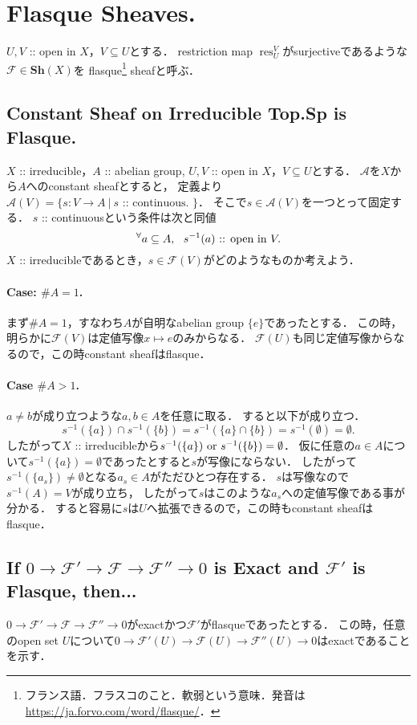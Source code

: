 \documentclass[a4paper]{jsarticle}
\newcommand{\shA}{\mathcal{A}}
\newcommand{\shF}{\mathcal{F}}
\newcommand{\Sh}{\mathbf{Sh}}
\newcommand{\res}{\operatorname{res}}
\newcommand{\OpenIn}{\text{ :: open in }}
\begin{document}
\section{Flasque Sheaves.} %
    $U,V$ :: open in $X$，$V \subseteq U$とする．
    restriction map $\res_U^V$がsurjectiveであるような$\shF \in \Sh(X)$を
    flasque\footnote{フランス語．フラスコのこと．軟弱という意味．発音は \url{https://ja.forvo.com/word/flasque/}．} sheafと呼ぶ．

    \subsection{Constant Sheaf on Irreducible Top.Sp is Flasque.}
    $X$ :: irreducible，$A$ :: abelian group, $U,V$ :: open in $X$，$V \subseteq U$とする．
    $\shA$を$X$から$A$へのconstant sheafとすると，
    定義より$\shA(V)=\{ s: V \to A ~|~ s \text{ :: continuous. }\}$．
    そこで$s \in \shA(V)$を一つとって固定する．
    $s$ :: continuousという条件は次と同値
    \[ \Forall{a \subseteq A} s^{-1}(a) \OpenIn V. \]
    $X$ :: irreducibleであるとき，$s \in \shF(V)$がどのようなものか考えよう．
    
    \paragraph{Case: $\#A=1$.}
    まず$\#A=1$，すなわち$A$が自明なabelian group $\{e\}$であったとする．
    この時，明らかに$\shF(V)$は定値写像$x \mapsto e$のみからなる．
    $\shF(U)$も同じ定値写像からなるので，この時constant sheafはflasque．

    \paragraph{Case $\#A>1$.}
    $a \neq b$が成り立つような$a,b \in A$を任意に取る．
    すると以下が成り立つ．
    \[ s^{-1}(\{a\}) \cap s^{-1}(\{b\})=s^{-1}(\{a\} \cap \{b\})=s^{-1}(\emptyset)=\emptyset. \]
    したがって$X$ :: irreducibleから$s^{-1}(\{a\}) \text{ or } s^{-1}(\{b\})=\emptyset$．
    仮に任意の$a \in A$について$s^{-1}(\{a\})=\emptyset$であったとすると$s$が写像にならない．
    したがって$s^{-1}(\{a_s\}) \neq \emptyset$となる$a_s \in A$がただひとつ存在する．
    $s$は写像なので$s^{-1}(A)=V$が成り立ち，
    したがって$s$はこのような$a_s$への定値写像である事が分かる．
    すると容易に$s$は$U$へ拡張できるので，この時もconstant sheafはflasque．

    \subsection{If $0 \to \shF' \to \shF \to \shF'' \to 0$ is Exact and $\shF'$ is Flasque, then... }
    $0 \to \shF' \to \shF \to \shF'' \to 0$がexactかつ$\shF'$がflasqueであったとする．
    この時，任意のopen set $U$について$0 \to \shF'(U) \to \shF(U) \to \shF''(U) \to 0$はexactであることを示す．
\end{document}
